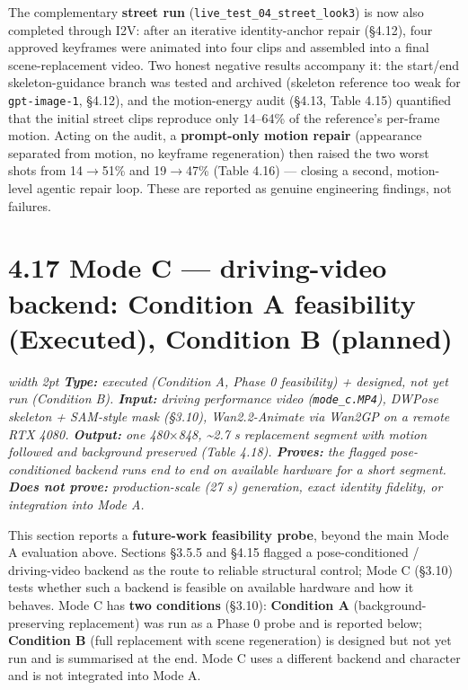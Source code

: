 \documentclass[10pt,twocolumn,letterpaper]{article}
\newenvironment{quotebox}%
 {\par\vspace{3pt}\noindent\begin{list}{}{\setlength{\leftmargin}{1em}\setlength{\rightmargin}{0.5em}}\item\footnotesize\itshape\color{black!80}\hspace*{-0.6em}\vrule width 2pt\hspace{0.6em}\ignorespaces}%
 {\end{list}\vspace{3pt}}
\begin{document}
The complementary \textbf{street run} (\texttt{live\_test\_04\_street\_look3}) is now also completed through I2V: after an iterative identity-anchor repair (\S{}4.12), four approved keyframes were animated into four clips and assembled into a final scene-replacement video. Two honest negative results accompany it: the start/end skeleton-guidance branch was tested and archived (skeleton reference too weak for \texttt{gpt-image-1}, \S{}4.12), and the motion-energy audit (\S{}4.13, Table 4.15) quantified that the initial street clips reproduce only 14--64\% of the reference's per-frame motion. Acting on the audit, a \textbf{prompt-only motion repair} (appearance separated from motion, no keyframe regeneration) then raised the two worst shots from 14$\rightarrow$51\% and 19$\rightarrow$47\% (Table 4.16) --- closing a second, motion-level agentic repair loop. These are reported as genuine engineering findings, not failures.


\section*{4.17 Mode C --- driving-video backend: Condition A feasibility (Executed), Condition B (planned)}

\begin{quotebox}
\textbf{Type:} executed (Condition A, Phase 0 feasibility) + designed, not yet run (Condition B). \quad \textbf{Input:} driving performance video (\texttt{mode\_c.MP4}), DWPose skeleton + SAM-style mask (\S{}3.10), Wan2.2-Animate via Wan2GP on a remote RTX 4080. \quad \textbf{Output:} one 480$\times$848, \textasciitilde{}2.7 s replacement segment with motion followed and background preserved (Table 4.18). \quad \textbf{Proves:} the flagged pose-conditioned backend runs end to end on available hardware for a short segment. \quad \textbf{Does not prove:} production-scale (27 s) generation, exact identity fidelity, or integration into Mode A.
\end{quotebox}

This section reports a \textbf{future-work feasibility probe}, beyond the main Mode A evaluation above. Sections \S{}3.5.5 and \S{}4.15 flagged a pose-conditioned / driving-video backend as the route to reliable structural control; Mode C (\S{}3.10) tests whether such a backend is feasible on available hardware and how it behaves. Mode C has \textbf{two conditions} (\S{}3.10): \textbf{Condition A} (background-preserving replacement) was run as a Phase 0 probe and is reported below; \textbf{Condition B} (full replacement with scene regeneration) is designed but not yet run and is summarised at the end. Mode C uses a different backend and character and is not integrated into Mode A.
\end{document}
